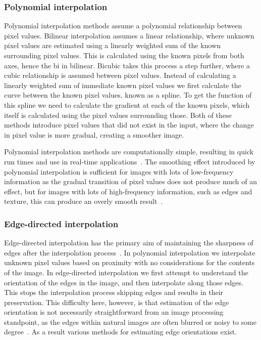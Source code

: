\subsubsection{Polynomial interpolation}
Polynomial interpolation methods assume a polynomial relationship between pixel values. Bilinear interpolation assumes a linear relationship, where unknown pixel values are estimated using a linearly weighted sum of the known surrounding pixel values. This is calculated using the known pixels from both axes, hence the bi in bilinear. Bicubic takes this process a step further, where a cubic relationship is assumed between pixel values. Instead of calculating a linearly weighted sum of immediate known pixel values we first calculate the curve between the known pixel values, known as a spline. To get the function of this spline we need to calculate the gradient at each of the known pixels, which itself is calculated using the pixel values surrounding those. Both of these methods introduce pixel values that did not exist in the input, where the change in pixel value is more gradual, creating a smoother image.

Polynomial interpolation methods are computationally simple, resulting in quick run times and use in real-time applications~\cite{interpolation}. The smoothing effect introduced by polynomial interpolation is sufficient for images with lots of low-frequency information as the gradual transition of pixel values does not produce much of an effect, but for images with lots of high-frequency information, such as edges and texture, this can produce an overly smooth result~\cite{interpolation}.

\subsubsection{Edge-directed interpolation}
Edge-directed interpolation has the primary aim of maintaining the sharpness of edges after the interpolation process~\cite{interpolation}. In polynomial interpolation we interpolate unknown pixel values based on proximity with no considerations for the contents of the image. In edge-directed interpolation we first attempt to understand the orientation of the edges in the image, and then interpolate along those edges. This stops the interpolation process skipping edges and results in their preservation. This difficulty here, however, is that estimation of the edge orientation is not necessarily straightforward from an image processing standpoint, as the edges within natural images are often blurred or noisy to some degree~\cite{interpolation}. As a result various methods for estimating edge orientations exist.

